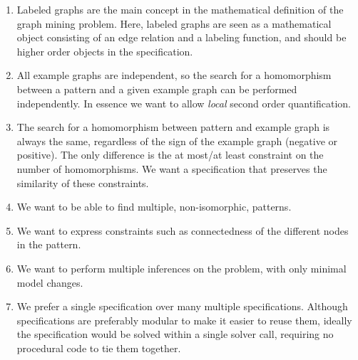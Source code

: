 \begin{enumerate}[itemsep=0mm]
\item Labeled graphs are the main concept in the mathematical definition of the graph mining problem. 
Here, labeled graphs are seen as a mathematical object consisting of an edge relation and a labeling function, and should be higher order objects in the specification.
\item All example graphs are independent, so the search for a homomorphism between a pattern and a given example graph can be performed independently. 
In essence we want to allow \emph{local} second order quantification.  %
\item The search for a homomorphism between pattern and example graph is always the same, regardless of the sign of the example graph (negative or positive). The only difference is the at most/at least constraint on the number of homomorphisms.
We want a specification that preserves the similarity of these constraints.
\item We want to be able to find multiple, non-isomorphic, patterns.
\item We want to express constraints such as connectedness of the different nodes in the pattern.
\item We want to perform multiple inferences on the problem, with only minimal model changes.
\item We prefer a single specification over many multiple specifications. 
Although specifications are preferably modular to make it easier to reuse them, ideally the specification would be solved within a single solver call, requiring no procedural code to tie them together.
\end{enumerate}


